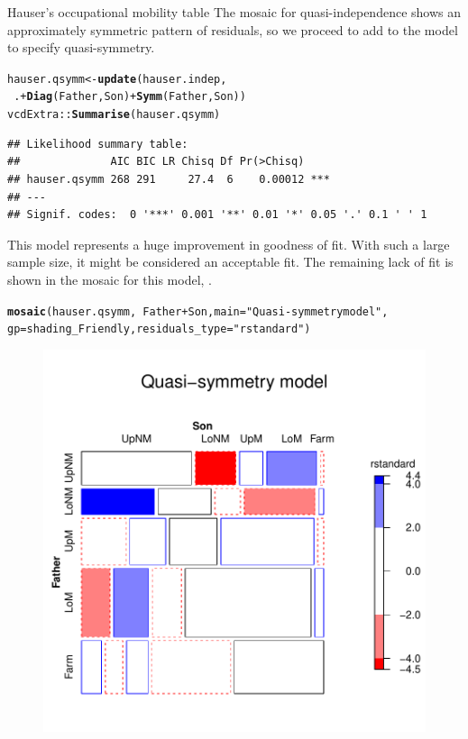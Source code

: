 \documentclass[11pt]{book}\usepackage[]{graphicx}\usepackage[]{color}
\makeatletter
\newcommand{\hlstr}[1]{\textcolor[rgb]{0.192,0.494,0.8}{#1}}%
\newcommand{\hlopt}[1]{\textcolor[rgb]{0,0,0}{#1}}%
\newcommand{\hlstd}[1]{\textcolor[rgb]{0.345,0.345,0.345}{#1}}%
\newcommand{\hlkwb}[1]{\textcolor[rgb]{0.69,0.353,0.396}{#1}}%
\newcommand{\hlkwc}[1]{\textcolor[rgb]{0.333,0.667,0.333}{#1}}%
\newcommand{\hlkwd}[1]{\textcolor[rgb]{0.737,0.353,0.396}{\textbf{#1}}}%
\newenvironment{kframe}{%
 \def\at@end@of@kframe{}%
 \ifinner\ifhmode%
  \def\at@end@of@kframe{\end{minipage}}%
  \begin{minipage}{\columnwidth}%
 \fi\fi%
 \def\FrameCommand##1{\hskip\@totalleftmargin \hskip-\fboxsep
 \colorbox{shadecolor}{##1}\hskip-\fboxsep
     \hskip-\linewidth \hskip-\@totalleftmargin \hskip\columnwidth}%
 \MakeFramed {\advance\hsize-\width
   \@totalleftmargin\z@ \linewidth\hsize
   \@setminipage}}%
 {\par\unskip\endMakeFramed%
 \at@end@of@kframe}
\newenvironment{knitrout}{}{} %
\renewenvironment{knitrout}{\small\renewcommand{\baselinestretch}{.85}}{} %
\makeatother
\begin{document}
\begin{Example}[hauser1]{Hauser's occupational mobility table}
The mosaic for quasi-independence shows an approximately symmetric
pattern of residuals, so we proceed to add 
to the model to specify quasi-symmetry.
\begin{knitrout}
\color{fgcolor}\begin{kframe}
\begin{alltt}
\hlstd{hauser.qsymm} \hlkwb{<-}  \hlkwd{update}\hlstd{(hauser.indep,}
                        \hlopt{~} \hlstd{.} \hlopt{+} \hlkwd{Diag}\hlstd{(Father,Son)} \hlopt{+} \hlkwd{Symm}\hlstd{(Father,Son))}
\hlstd{vcdExtra::}\hlkwd{Summarise}\hlstd{(hauser.qsymm)}
\end{alltt}
\begin{verbatim}
## Likelihood summary table:
##              AIC BIC LR Chisq Df Pr(>Chisq)    
## hauser.qsymm 268 291     27.4  6    0.00012 ***
## ---
## Signif. codes:  0 '***' 0.001 '**' 0.01 '*' 0.05 '.' 0.1 ' ' 1
\end{verbatim}
\end{kframe}
\end{knitrout}
This model represents a huge improvement in goodness of fit.
With such a large sample size, it might be considered an acceptable
fit. The remaining lack of fit is shown in the
mosaic for this model, .
\begin{knitrout}
\color{fgcolor}\begin{kframe}
\begin{alltt}
\hlkwd{mosaic}\hlstd{(hauser.qsymm,} \hlopt{~}\hlstd{Father}\hlopt{+}\hlstd{Son,} \hlkwc{main}\hlstd{=}\hlstr{"Quasi-symmetry model"}\hlstd{,}
       \hlkwc{gp}\hlstd{=shading_Friendly,} \hlkwc{residuals_type}\hlstd{=}\hlstr{"rstandard"}\hlstd{)}
\end{alltt}
\end{kframe}\begin{figure}[!htbp]


\centerline{\includegraphics[width=.6\textwidth]{ch08/fig/hauser-mosaic2-1} }


\end{figure}
\end{knitrout}
\end{Example}
\end{document}

